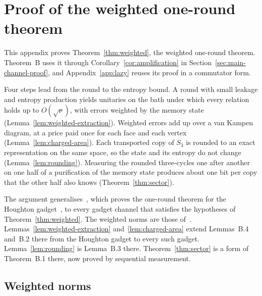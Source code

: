 \section{Proof of the weighted one-round theorem}\label{sec:weighted-proof}

This appendix proves Theorem~\ref{thm:weighted}, the weighted one-round theorem. Theorem~B uses it through
Corollary~\ref{cor:amplification} in Section~\ref{sec:main-channel-proof}, and Appendix~\ref{app:lazy} reuses its proof in a commutator form.

Four steps lead from the round to the entropy bound. A round with small leakage and entropy production yields unitaries on the bath under
which every relation holds up to $O(\sqrt\nu)$, with errors weighted by the memory state (Lemma~\ref{lem:weighted-extraction}). Weighted
errors add up over a van Kampen diagram, at a price paid once for each face and each vertex (Lemma~\ref{lem:charged-area}). Each transported
copy of $S_3$ is rounded to an exact representation on the same space, so the state and its entropy do not change
(Lemma~\ref{lem:rounding}). Measuring the rounded three-cycles one after another on one half of a purification of the memory state
produces about one bit per copy that the other half also knows (Theorem~\ref{thm:sector}).

The argument generalises~\cite[Appendix~B]{DouglasMghirbiB}, which proves the one-round theorem for the Houghton
gadget~\cite[Theorem~5.5]{DouglasMghirbiB}, to every gadget channel that satisfies the hypotheses of Theorem~\ref{thm:weighted}. The weighted
norms are those of~\cite[Appendix~B]{DouglasMghirbiB}. Lemmas~\ref{lem:weighted-extraction} and~\ref{lem:charged-area} extend Lemmas~B.4
and~B.2 there from the Houghton gadget to every such gadget. Lemma~\ref{lem:rounding} is Lemma~B.3 there. Theorem~\ref{thm:sector} is a form
of Theorem~B.1 there, now proved by sequential measurement.

\subsection{Weighted norms}

